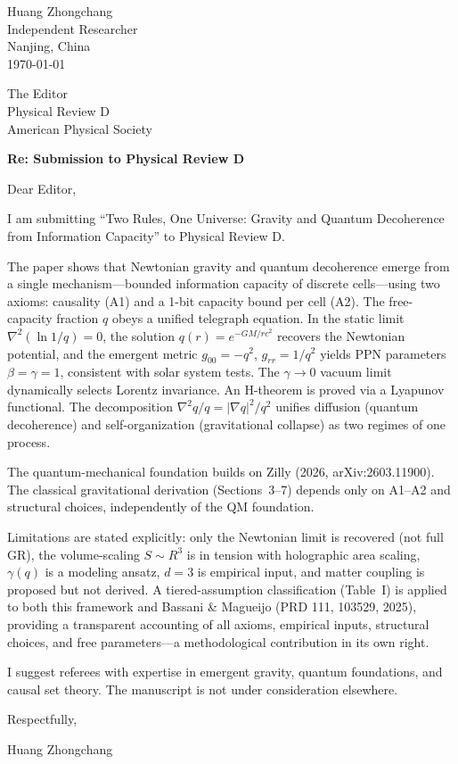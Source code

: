 \documentclass[12pt]{article}
\begin{document}
\begin{flushright}
Huang Zhongchang\\
Independent Researcher\\
Nanjing, China\\
\today
\end{flushright}

\vspace{0.3in}

\noindent The Editor\\
Physical Review D\\
American Physical Society

\vspace{0.2in}

\noindent \textbf{Re: Submission to Physical Review D}

\vspace{0.1in}

\noindent Dear Editor,

I am submitting ``Two Rules, One Universe: Gravity and Quantum Decoherence from Information Capacity'' to Physical Review D.

The paper shows that Newtonian gravity and quantum decoherence emerge from a single mechanism---bounded information capacity of discrete cells---using two axioms: causality (A1) and a 1-bit capacity bound per cell (A2). The free-capacity fraction $q$ obeys a unified telegraph equation. In the static limit $\nabla^2(\ln 1/q)=0$, the solution $q(r)=e^{-GM/rc^2}$ recovers the Newtonian potential, and the emergent metric $g_{00}=-q^2$, $g_{rr}=1/q^2$ yields PPN parameters $\beta=\gamma=1$, consistent with solar system tests. The $\gamma\to0$ vacuum limit dynamically selects Lorentz invariance. An H-theorem is proved via a Lyapunov functional. The decomposition $\nabla^2 q/q=|\nabla q|^2/q^2$ unifies diffusion (quantum decoherence) and self-organization (gravitational collapse) as two regimes of one process.

The quantum-mechanical foundation builds on Zilly (2026, arXiv:2603.11900). The classical gravitational derivation (Sections~3--7) depends only on A1--A2 and structural choices, independently of the QM foundation.

Limitations are stated explicitly: only the Newtonian limit is recovered (not full GR), the volume-scaling $S\sim R^3$ is in tension with holographic area scaling, $\gamma(q)$ is a modeling ansatz, $d=3$ is empirical input, and matter coupling is proposed but not derived. A tiered-assumption classification (Table~I) is applied to both this framework and Bassani \& Magueijo (PRD 111, 103529, 2025), providing a transparent accounting of all axioms, empirical inputs, structural choices, and free parameters---a methodological contribution in its own right.

I suggest referees with expertise in emergent gravity, quantum foundations, and causal set theory. The manuscript is not under consideration elsewhere.

\vspace{0.15in}
\noindent Respectfully,

\vspace{0.3in}
\noindent Huang Zhongchang
\end{document}
